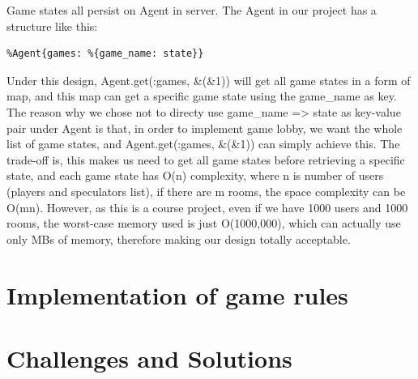 Game states all persist on Agent in server. The Agent in our project has a 
structure like this:
\begin{lstlisting}
%Agent{games: %{game_name: state}}
\end{lstlisting}
Under this design, Agent.get(:games, \&(\&1)) will get all game states in a form 
of map, and this map can get a specific game state using the game\_name as key. 
The reason why we chose not to directy use {game\_name => state} as key-value 
pair under Agent is that, in order to implement game lobby, we want the whole 
list of game states, and Agent.get(:games, \&(\&1)) can simply achieve this. The 
trade-off is, this makes us need to get all game states before retrieving a 
specific state, and each game state has O(n) complexity, where n is number of 
users (players and speculators list), if there are m rooms, the space complexity 
can be O(mn). However, as this is a course project, even if we have 1000 users 
and 1000 rooms, the worst-case memory used is just O(1000,000), which can 
actually use only MBs of memory, therefore making our design totally acceptable.

\section{Implementation of game rules}
\section{Challenges and Solutions}




